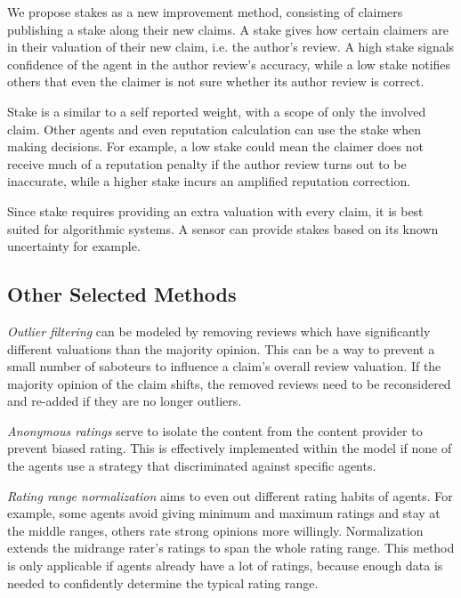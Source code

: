 \documentclass[%
    ]{\PathToTumTemplate/thesis/tum_thesis}
\begin{document}
We propose stakes as a new improvement method, consisting of claimers publishing a stake along their new claims.
A stake gives how certain claimers are in their valuation of their new claim, i.e. the author's review.
A high stake signals confidence of the agent in the author review's accuracy, while a low stake notifies others that even the claimer is not sure whether its author review is correct.

Stake is a similar to a self reported weight, with a scope of only the involved claim.
Other agents and even reputation calculation can use the stake when making decisions.
For example, a low stake could mean the claimer does not receive much of a reputation penalty if the author review turns out to be inaccurate, while a higher stake incurs an amplified reputation correction.

Since stake requires providing an extra valuation with every claim, it is best suited for algorithmic systems.
A sensor can provide stakes based on its known uncertainty for example.


\subsection{Other Selected Methods}

\emph{Outlier filtering} can be modeled by removing reviews which have significantly different valuations than the majority opinion.
This can be a way to prevent a small number of saboteurs to influence a claim's overall review valuation.
If the majority opinion of the claim shifts, the removed reviews need to be reconsidered and re-added if they are no longer outliers.

\emph{Anonymous ratings} serve to isolate the content from the content provider to prevent biased rating.
This is effectively implemented within the model if none of the agents use a strategy that discriminated against specific agents.

\emph{Rating range normalization} aims to even out different rating habits of agents.
For example, some agents avoid giving minimum and maximum ratings and stay at the middle ranges, others rate strong opinions more willingly.
Normalization extends the midrange rater's ratings to span the whole rating range.
This method is only applicable if agents already have a lot of ratings, because enough data is needed to confidently determine the typical rating range.
\end{document}

